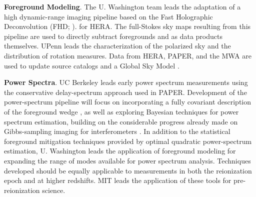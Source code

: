 \documentclass[preprint]{aastex}
\newcommand{\Mycitep}[1]{{\bf \citep{#1}}}
\newcommand{\Mycitealt}[1]{{\bf \citealt{#1}}}
\newcommand{\compress}{\vspace{-0.25in}}
\begin{document}

{\bf Foreground Modeling}. The U. Washington team leads the adaptation
of a high dynamic-range imaging pipeline
based on the Fast Holographic Deconvolution (FHD; \Mycitealt{sullivan_et_al2012}).
for HERA.  The full-Stokes sky maps resulting from this pipeline
are used to directly subtract foregrounds
and as data products themselves.  UPenn leads
the characterization of the polarized sky and the
distribution of rotation measures.  Data from HERA, PAPER, and the MWA are used
to update source catalogs and a Global
Sky Model \Mycitep{deoliveira2008}. %



{\bf Power Spectra}. UC Berkeley leads early power spectrum measurements using the conservative
delay-spectrum approach used in PAPER.  %
Development of
the power-spectrum pipeline will focus on incorporating
a fully covariant description of the foreground wedge
\Mycitep{liu_tegmark2011,dillon_et_al2013a}, as well as
exploring Bayesian techniques for power spectrum estimation, building on the considerable
progress already made on Gibbs-sampling imaging for interferometers \Mycitep{sutter_et_al2014}.
In addition to the statistical foreground mitigation techniques provided by optimal quadratic
power-spectrum estimation, U. Washington leads the application of 
foreground modeling for expanding the range of modes available for power spectrum analysis.
Techniques developed should be equally applicable
to measurements in both the reionization epoch and at higher redshifts.  MIT leads the application
of these tools for pre-reionization science.
\end{document}

